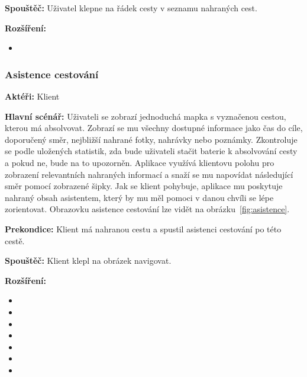 \documentclass[czech,master,public,dept460,male,java,cpdeclaration]{diploma}
\newcommand{\usecase}[2]{\subsubsection{#1}\label{#2}}
\begin{document}
\vspace{0.1cm}
\noindent
\textbf{Spouštěč:} Uživatel klepne na řádek cesty v seznamu nahraných cest.

\vspace{0.1cm}
\noindent
\textbf{Rozšíření:}
\begin{itemize}
  \item {}
\end{itemize}


\usecase{Asistence cestování}{asistence}
\textbf{Aktéři:} Klient

\vspace{0.1cm}
\noindent
\textbf{Hlavní scénář:} Uživateli se zobrazí jednoduchá mapka s vyznačenou cestou, kterou má absolvovat.
Zobrazí se mu všechny dostupné informace jako čas do cíle, doporučený směr, nejbližší nahrané fotky,
nahrávky nebo poznámky. Zkontroluje se podle uložených statistik, zda bude uživateli stačit baterie
k absolvování cesty a pokud ne, bude na to upozorněn.
Aplikace využívá klientovu polohu pro zobrazení relevantních nahraných informací
a snaží se mu napovídat následující směr pomocí zobrazené šipky. Jak se klient pohybuje, aplikace mu
poskytuje nahraný obsah asistentem, který by mu měl pomoci v danou chvíli se lépe zorientovat.
Obrazovku asistence cestování lze vidět na obrázku~\ref{fig:asistence}.

\vspace{0.1cm}
\noindent
\textbf{Prekondice:} Klient má nahranou cestu a spustil asistenci cestování po této cestě.

\vspace{0.1cm}
\noindent
\textbf{Spouštěč:} Klient klepl na obrázek navigovat.

\vspace{0.1cm}
\noindent
\textbf{Rozšíření:}
\begin{itemize}
  \item {}
  \item {}
  \item {}
  \item {}
  \item {}
  \item {}
  \item {}
\end{itemize}
\end{document}
